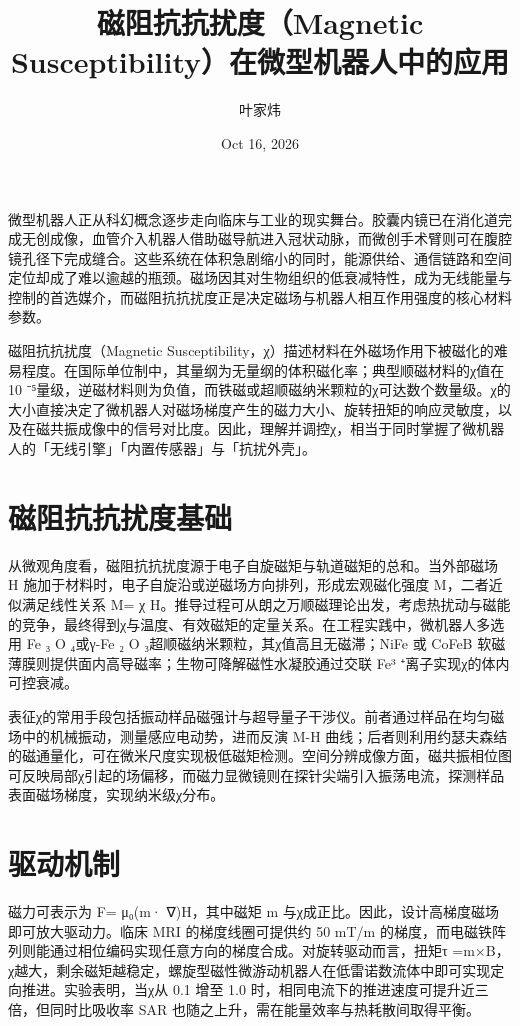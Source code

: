\title{磁阻抗抗扰度（Magnetic Susceptibility）在微型机器人中的应用}
\author{叶家炜}
\date{Oct 16, 2026}
\maketitle
微型机器人正从科幻概念逐步走向临床与工业的现实舞台。胶囊内镜已在消化道完成无创成像，血管介入机器人借助磁导航进入冠状动脉，而微创手术臂则可在腹腔镜孔径下完成缝合。这些系统在体积急剧缩小的同时，能源供给、通信链路和空间定位却成了难以逾越的瓶颈。磁场因其对生物组织的低衰减特性，成为无线能量与控制的首选媒介，而磁阻抗抗扰度正是决定磁场与机器人相互作用强度的核心材料参数。\par
磁阻抗抗扰度（Magnetic Susceptibility，χ）描述材料在外磁场作用下被磁化的难易程度。在国际单位制中，其量纲为无量纲的体积磁化率；典型顺磁材料的χ值在 10 ⁻⁵量级，逆磁材料则为负值，而铁磁或超顺磁纳米颗粒的χ可达数个数量级。χ的大小直接决定了微机器人对磁场梯度产生的磁力大小、旋转扭矩的响应灵敏度，以及在磁共振成像中的信号对比度。因此，理解并调控χ，相当于同时掌握了微机器人的「无线引擎」「内置传感器」与「抗扰外壳」。\par
\chapter{磁阻抗抗扰度基础}
从微观角度看，磁阻抗抗扰度源于电子自旋磁矩与轨道磁矩的总和。当外部磁场 H 施加于材料时，电子自旋沿或逆磁场方向排列，形成宏观磁化强度 M，二者近似满足线性关系 M= χ H。推导过程可从朗之万顺磁理论出发，考虑热扰动与磁能的竞争，最终得到χ与温度、有效磁矩的定量关系。在工程实践中，微机器人多选用 Fe ₃ O ₄或γ-Fe ₂ O ₃超顺磁纳米颗粒，其χ值高且无磁滞；NiFe 或 CoFeB 软磁薄膜则提供面内高导磁率；生物可降解磁性水凝胶通过交联 Fe³ ⁺离子实现χ的体内可控衰减。\par
表征χ的常用手段包括振动样品磁强计与超导量子干涉仪。前者通过样品在均匀磁场中的机械振动，测量感应电动势，进而反演 M-H 曲线；后者则利用约瑟夫森结的磁通量化，可在微米尺度实现极低磁矩检测。空间分辨成像方面，磁共振相位图可反映局部χ引起的场偏移，而磁力显微镜则在探针尖端引入振荡电流，探测样品表面磁场梯度，实现纳米级χ分布。\par
\chapter{驱动机制}
磁力可表示为 F= μ₀(m· ∇)H，其中磁矩 m 与χ成正比。因此，设计高梯度磁场即可放大驱动力。临床 MRI 的梯度线圈可提供约 50 mT/m 的梯度，而电磁铁阵列则能通过相位编码实现任意方向的梯度合成。对旋转驱动而言，扭矩τ =m×B，χ越大，剩余磁矩越稳定，螺旋型磁性微游动机器人在低雷诺数流体中即可实现定向推进。实验表明，当χ从 0.1 增至 1.0 时，相同电流下的推进速度可提升近三倍，但同时比吸收率 SAR 也随之上升，需在能量效率与热耗散间取得平衡。\par
